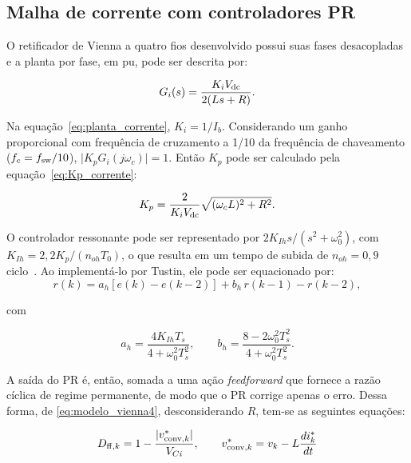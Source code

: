 \subsection{Malha de corrente com controladores PR}

O retificador de Vienna a quatro fios desenvolvido possui suas fases desacopladas e a
planta por fase, em pu, pode ser descrita por:

\begin{equation}
    G_i(s) = \frac{K_iV_{\mathrm{dc}}}{2(Ls+R)}.
    \label{eq:planta_corrente}
\end{equation}

Na equação~\eqref{eq:planta_corrente}, $K_i = 1/I_b$. Considerando um ganho proporcional com frequência de cruzamento a
1/10 da frequência de chaveamento ($f_c=f_{\mathrm{sw}}/10$), $\lvert K_pG_i(j\omega_c)\rvert=1$. Então $K_p$ pode
ser calculado pela equação~\eqref{eq:Kp_corrente}:

\begin{equation}
    K_p=\frac{2}{K_iV_{\mathrm{dc}}}\sqrt{(\omega_cL)^2+R^2}.
    \label{eq:Kp_corrente}
\end{equation}

O controlador ressonante pode ser representado por $2K_{Ih}s/(s^2+\omega_0^2)$, com $K_{Ih} = 2{,}2K_p/(n_{oh}T_0)$, o
que resulta em um tempo de subida de $n_{oh}=0{,}9$ ciclo~\cite{alonso2018distributed}. Ao implementá-lo por Tustin,
ele pode ser equacionado por:
\begin{equation}
    r(k) = a_h\left[e(k)- e(k-2)\right]+b_h\,r(k-1)-r(k-2),
    \label{eq:tustin}
\end{equation}

com

\begin{equation}
    a_h = \frac{4K_{Ih}T_s}{4+\omega_0^2T_s^2}, \qquad
    b_h = \frac{8-2\omega_0^2T_s^2}{4+\omega_0^2T_s^2}.
    \label{eq:tustin_coef}
\end{equation}

A saída do PR é, então, somada a uma ação \textit{feedforward} que fornece a razão
cíclica de regime permanente, de modo que o PR corrige apenas o erro. Dessa forma, de
\eqref{eq:modelo_vienna4}, desconsiderando $R$, tem-se as seguintes equações:

\begin{equation}
    D_{\mathrm{ff},k} =1 - \frac{\lvert v^*_{\mathrm{conv},k}\rvert}{V_{Ci}}, \qquad v^*_{\mathrm{conv},k} = v_k-L\frac{di^*_k}{dt}
    \label{eq:razão_ciclíca}
\end{equation}

